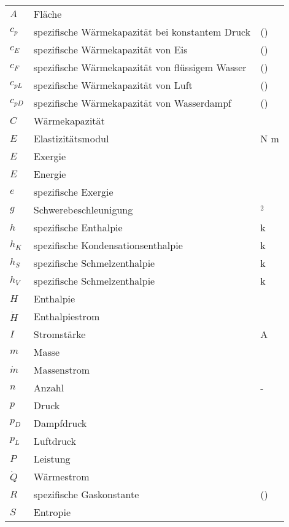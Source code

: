 \begin{onehalfspacing}
\begin{longtable}[h]{p{} p{} p{}}
		$A$ & Fläche & \squaremetre\\
		$c_{p}$&spezifische Wärmekapazität bei konstantem Druck&\joule\per(\kilogram\usk\kelvin)\\
		$c_{E}$&spezifische Wärmekapazität von Eis&\joule\per(\kilogram\usk\kelvin)\\		
		$c_{F}$&spezifische Wärmekapazität von flüssigem Wasser&\joule\per(\kilogram\usk\kelvin)\\
		$c_{pL}$&spezifische Wärmekapazität von Luft&\joule\per(\kilogram\usk\kelvin)\\	
		$c_{pD}$&spezifische Wärmekapazität von Wasserdampf &\joule\per(\kilogram\usk\kelvin)\\		
		$C$&Wärmekapazität&\watt\per\kilogram\\
		$E$ & Elastizitätsmodul & N \per m\squaremetre \\
		$E$ & Exergie & \joule\\
		$E$ & Energie & \joule\\
		$e$ & spezifische Exergie & \joule\per\kilogram\\
		$g$ & Schwerebeschleunigung & \meter \per \second$^2$\\
		$h $ & spezifische Enthalpie & k\joule \per \kilogram\\		
		$h_{K} $ & spezifische Kondensationsenthalpie & k\joule \per \kilogram\\	
		$h_{S} $ & spezifische Schmelzenthalpie & k\joule \per \kilogram\\	
		$h_{V} $ & spezifische Schmelzenthalpie & k\joule \per \kilogram\\
		$H $ & Enthalpie & \joule\\		
		$\dot{H}$ & Enthalpiestrom & \joule\per\second\\
		$I$ 	& Stromstärke & A \\
		$m$ & Masse & \kilogram \\
		$\dot{m}$ & Massenstrom & \kilogram\per\second\\
		$n$ & Anzahl & -\\
		$p$ & Druck & \pascal\\
		$p_{D}$ & Dampfdruck & \pascal\\
		$p_{L}$ & Luftdruck & \pascal\\		
		$P$ & Leistung & \watt \\
		$\dot{Q}$ & Wärmestrom & \watt\\
		$R$ & spezifische Gaskonstante & \joule\per(\kilogram\usk\kelvin)\\
		$S$ & Entropie & \joule\per\kelvin\\

\end{longtable}
\end{onehalfspacing}
